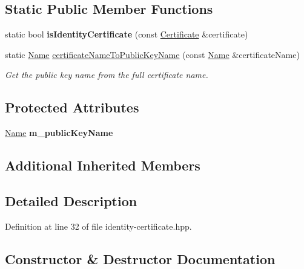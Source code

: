 \subsection*{Static Public Member Functions}
\begin{DoxyCompactItemize}
\item 
static bool {\bfseries is\+Identity\+Certificate} (const \hyperlink{classndn_1_1Certificate}{Certificate} \&certificate)\hypertarget{classndn_1_1IdentityCertificate_afc18f225c70626be093976e1ad723a5c}{}\label{classndn_1_1IdentityCertificate_afc18f225c70626be093976e1ad723a5c}

\item 
static \hyperlink{classndn_1_1Name}{Name} \hyperlink{classndn_1_1IdentityCertificate_adb2f8c0ace38d8c8413d1054cbea7768}{certificate\+Name\+To\+Public\+Key\+Name} (const \hyperlink{classndn_1_1Name}{Name} \&certificate\+Name)
\begin{DoxyCompactList}\small\item\em Get the public key name from the full certificate name. \end{DoxyCompactList}\end{DoxyCompactItemize}
\subsection*{Protected Attributes}
\begin{DoxyCompactItemize}
\item 
\hyperlink{classndn_1_1Name}{Name} {\bfseries m\+\_\+public\+Key\+Name}\hypertarget{classndn_1_1IdentityCertificate_a9086eae1e30c89c53af4f19e0eae1bc6}{}\label{classndn_1_1IdentityCertificate_a9086eae1e30c89c53af4f19e0eae1bc6}

\end{DoxyCompactItemize}
\subsection*{Additional Inherited Members}


\subsection{Detailed Description}


Definition at line 32 of file identity-\/certificate.\+hpp.



\subsection{Constructor \& Destructor Documentation}
